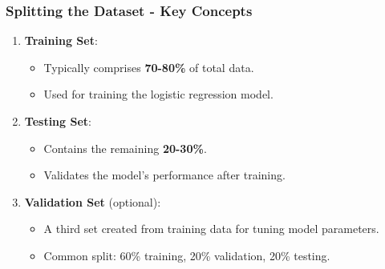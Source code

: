 \documentclass[aspectratio=169]{beamer}
\begin{document}
\begin{frame}[fragile]
  \frametitle{Splitting the Dataset - Key Concepts}
  \begin{enumerate}
    \item \textbf{Training Set}:
      \begin{itemize}
        \item Typically comprises \textbf{70-80\%} of total data.
        \item Used for training the logistic regression model.
      \end{itemize}
      
    \item \textbf{Testing Set}:
      \begin{itemize}
        \item Contains the remaining \textbf{20-30\%}.
        \item Validates the model's performance after training.
      \end{itemize}
      
    \item \textbf{Validation Set} (optional):
      \begin{itemize}
        \item A third set created from training data for tuning model parameters.
        \item Common split: 60\% training, 20\% validation, 20\% testing.
      \end{itemize}
  \end{enumerate}
\end{frame}
\end{document}
